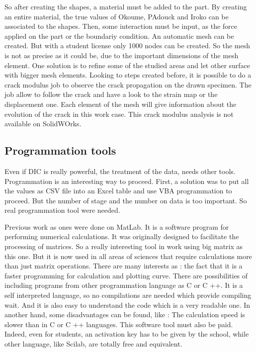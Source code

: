 So after creating the shapes, a material must be added to the part. By creating an entire material, the true values of Okoume, PAdouck and Iroko can be associated to the shapes. Then, some interaction must be input, as the force applied on the part or the boundariy condition. An automatic mesh can be created. But with a student license only 1000 nodes can be created. So the mesh is not as precise as it could be, due to the important dimensions of the mesh element. One solution is to refine some of the studied areas and let other surface with bigger mesh elements. Looking to steps created before, it is possible to do a crack modulus job to observe the crack propagation on the drawn specimen. The job allow to follow the crack and have a look to the strain map or the displacement one. Each element of the mesh will give information about the evolution of the crack in this work case. This crack modulus analysis is not available on SolidWOrks. 

\subsection{Programmation tools}

Even if DIC is really powerful, the treatment of the data, needs other tools. Programmation is an interesting way to proceed. 
First, a solution was to put all the values as CSV file into an Excel table and use VBA programmation to proceed. But the number of stage and the number on data is too important. So real programmation tool were needed.

Previous work as \parencite{Reference14} ones were done on MatLab. It is a software program for performing numerical calculations. It was originally designed to facilitate the processing of matrices. So a really interesting tool in work using big matrix as this one. But it is now used in all areas of sciences that require calculations more than just matrix operations. There are many interests as :
\newline
the fact that it is a faster programming for calculation and plotting curve. There are possibilities of including programs from other programmation language as C or C ++. It is a self interpreted language, so no compilations are needed which provide compiling wait. And it is also easy to understand the code which is a very readable one. In another hand, some disadvantages can be found, like :
\newline
The calculation speed is slower than in C or C ++ languages. This software tool must also be paid. Indeed, even for students, an activation key has to be given by the school, while other language, like Scilab, are totally free and equivalent.

